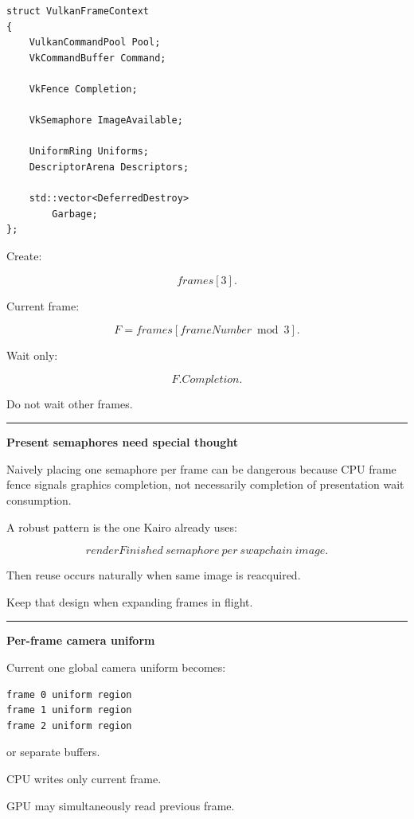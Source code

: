 \begin{verbatim}
struct VulkanFrameContext
{
    VulkanCommandPool Pool;
    VkCommandBuffer Command;

    VkFence Completion;

    VkSemaphore ImageAvailable;

    UniformRing Uniforms;
    DescriptorArena Descriptors;

    std::vector<DeferredDestroy>
        Garbage;
};
\end{verbatim}

Create:

\[
frames[3].
\]

Current frame:

\[
F=
frames[
frameNumber\bmod3
].
\]

Wait only:

\[
F.Completion.
\]

Do not wait other frames.

\begin{center}\rule{0.5\linewidth}{0.5pt}\end{center}

\textbf{Present semaphores need special thought}

Naively placing one  semaphore per frame can be dangerous because CPU frame fence signals graphics completion, not necessarily completion of presentation wait consumption.

A robust pattern is the one Kairo already uses:

\[
\boxed{
renderFinished\ semaphore\ per\ swapchain\ image.
}
\]

Then reuse occurs naturally when same image is reacquired.

Keep that design when expanding frames in flight.

\begin{center}\rule{0.5\linewidth}{0.5pt}\end{center}

\textbf{Per-frame camera uniform}

Current one global camera uniform becomes:

\begin{verbatim}
frame 0 uniform region
frame 1 uniform region
frame 2 uniform region
\end{verbatim}

or separate buffers.

CPU writes only current frame.

GPU may simultaneously read previous frame.

